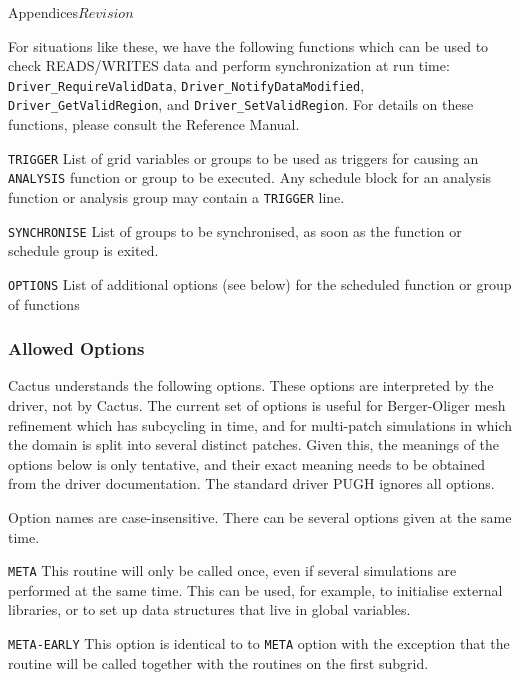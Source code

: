 \begin{cactuspart}{Appendices}{}{$Revision$}
\begin{Lentry}
For situations like these, we have the following functions which can be used to check READS/WRITES data and perform synchronization at run time:
\texttt{Driver\_RequireValidData}, \texttt{Driver\_NotifyDataModified}, \texttt{Driver\_GetValidRegion}, and \texttt{Driver\_SetValidRegion}. For details on these functions, please consult the Reference Manual.

  \item[{\tt TRIGGER}] List of grid variables or groups to be used as
  triggers for causing an {\tt ANALYSIS} function or group to be
  executed.  Any schedule block for an analysis function or analysis
  group may contain a {\tt TRIGGER} line.

  \item[{\tt SYNCHRONISE}] List of groups to be synchronised, as soon
    as the function or schedule group is exited.

  \item[{\tt OPTIONS}] List of additional options (see below) for the scheduled function or group of functions

\end{Lentry}

\subsubsection{Allowed Options}

\label{app:allopts}

Cactus understands the following options.  These options are
interpreted by the driver, not by Cactus.  The current set of options
is useful for Berger-Oliger mesh refinement which has subcycling in
time, and for multi-patch simulations in which the domain is split
into several distinct patches.  Given this, the meanings of the
options below is only tentative, and their exact meaning needs to be
obtained from the driver documentation.  The standard driver PUGH
ignores all options.

Option names are case-insensitive.  There can be several options given
at the same time.

\begin{Lentry}
  
\item[{\tt META}] This routine will only be called once, even if
  several simulations are performed at the same time.  This can be
  used, for example, to initialise external libraries, or to set up
  data structures that live in global variables.
  
\item[{\tt META-EARLY}] This option is identical to to {\tt META}
  option with the exception that the routine will be called together
  with the routines on the first subgrid.
  

\end{Lentry}
\end{cactuspart}
